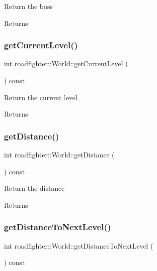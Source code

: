 Return the boss \begin{DoxyReturn}{Returns}

\end{DoxyReturn}
\mbox{\label{classroadfighter_1_1World_add95f57bb6322aab8a8e8c3ec2888a99}} 
\subsubsection{\texorpdfstring{get\+Current\+Level()}{getCurrentLevel()}}
{\footnotesize\ttfamily int roadfighter\+::\+World\+::get\+Current\+Level (\begin{DoxyParamCaption}{ }\end{DoxyParamCaption}) const}

Return the current level \begin{DoxyReturn}{Returns}

\end{DoxyReturn}
\mbox{\label{classroadfighter_1_1World_a0c19b2241b1846733cdd56d3a3e06824}} 
\subsubsection{\texorpdfstring{get\+Distance()}{getDistance()}}
{\footnotesize\ttfamily int roadfighter\+::\+World\+::get\+Distance (\begin{DoxyParamCaption}{ }\end{DoxyParamCaption}) const}

Return the distance \begin{DoxyReturn}{Returns}

\end{DoxyReturn}
\mbox{\label{classroadfighter_1_1World_a0f0dde0c7b4dedc0bf71136cde4f1b4d}} 
\subsubsection{\texorpdfstring{get\+Distance\+To\+Next\+Level()}{getDistanceToNextLevel()}}
{\footnotesize\ttfamily int roadfighter\+::\+World\+::get\+Distance\+To\+Next\+Level (\begin{DoxyParamCaption}{ }\end{DoxyParamCaption}) const}

